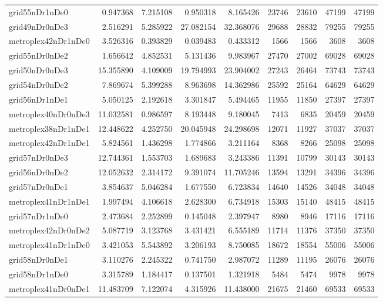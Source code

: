 \begin{longtable}{|l|r|r|r|r|r|r|r|r|}
grid55nDr1nDe0 & 0.947368 & 7.215108 & 0.950318 & 8.165426 & 23746 & 23610 & 47199 & 47199 \\
grid49nDr0nDe3 & 2.516291 & 5.285922 & 27.082154 & 32.368076 & 29688 & 28832 & 79255 & 79255 \\
metroplex42nDr1nDe0 & 3.526316 & 0.393829 & 0.039483 & 0.433312 & 1566 & 1566 & 3608 & 3608 \\
grid55nDr0nDe2 & 1.656642 & 4.852531 & 5.131436 & 9.983967 & 27470 & 27002 & 69028 & 69028 \\
grid50nDr0nDe3 & 15.355890 & 4.109009 & 19.794993 & 23.904002 & 27243 & 26464 & 73743 & 73743 \\
grid54nDr0nDe2 & 7.869674 & 5.399288 & 8.963698 & 14.362986 & 25592 & 25164 & 64629 & 64629 \\
grid56nDr1nDe1 & 5.050125 & 2.192618 & 3.301847 & 5.494465 & 11955 & 11850 & 27397 & 27397 \\
metroplex40nDr0nDe3 & 11.032581 & 0.986597 & 8.193448 & 9.180045 & 7413 & 6835 & 20459 & 20459 \\
metroplex38nDr1nDe1 & 12.448622 & 4.252750 & 20.045948 & 24.298698 & 12071 & 11927 & 37037 & 37037 \\
metroplex42nDr1nDe1 & 5.824561 & 1.436298 & 1.774866 & 3.211164 & 8368 & 8266 & 25098 & 25098 \\
grid57nDr0nDe3 & 12.744361 & 1.553703 & 1.689683 & 3.243386 & 11391 & 10799 & 30143 & 30143 \\
grid56nDr0nDe2 & 12.052632 & 2.314172 & 9.391074 & 11.705246 & 13594 & 13291 & 34396 & 34396 \\
grid57nDr0nDe1 & 3.854637 & 5.046284 & 1.677550 & 6.723834 & 14640 & 14526 & 34048 & 34048 \\
metroplex41nDr1nDe1 & 1.997494 & 4.106618 & 2.628300 & 6.734918 & 15303 & 15140 & 48415 & 48415 \\
grid57nDr1nDe0 & 2.473684 & 2.252899 & 0.145048 & 2.397947 & 8980 & 8946 & 17116 & 17116 \\
metroplex42nDr0nDe2 & 5.087719 & 3.123768 & 3.431421 & 6.555189 & 11714 & 11376 & 37350 & 37350 \\
metroplex41nDr1nDe0 & 3.421053 & 5.543892 & 3.206193 & 8.750085 & 18672 & 18554 & 55006 & 55006 \\
grid58nDr0nDe1 & 3.110276 & 2.245322 & 0.741750 & 2.987072 & 11289 & 11195 & 26076 & 26076 \\
grid58nDr1nDe0 & 3.315789 & 1.184417 & 0.137501 & 1.321918 & 5484 & 5474 & 9978 & 9978 \\
metroplex41nDr0nDe1 & 11.483709 & 7.122074 & 4.315926 & 11.438000 & 21675 & 21460 & 69533 & 69533 \\

\end{longtable}
